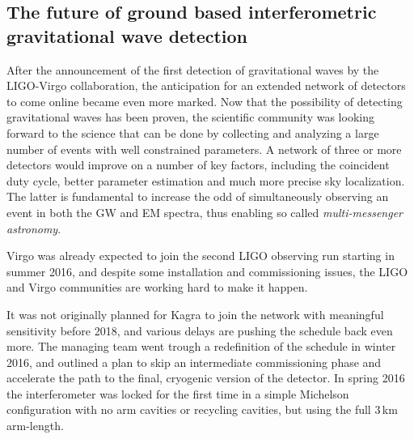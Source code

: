 \subsection{The future of ground based interferometric gravitational wave detection}\label{subsec:future}

After the announcement of the first detection of gravitational waves by the LIGO-Virgo collaboration, the anticipation for an extended network of detectors to come online became even more marked.
Now that the possibility of detecting gravitational waves has been proven, the scientific community was looking forward to the science that can be done by collecting and analyzing a large number of events with well constrained parameters.
A network of three or more detectors would improve on a number of key factors, including the coincident duty cycle, better parameter estimation and much more precise sky localization. The latter is fundamental to increase the odd of simultaneously observing an event in both the GW and EM spectra, thus enabling so called \textit{multi-messenger astronomy}.

Virgo was already expected to join the second LIGO observing run starting in summer 2016, and despite some installation and commissioning issues, the LIGO and Virgo communities are working hard to make it happen.

It was not originally planned for Kagra to join the network with meaningful sensitivity before 2018, and various delays are pushing the schedule back even more. 
The managing team went trough a redefinition of the schedule in winter 2016, and outlined a plan to skip an intermediate commissioning phase and accelerate the path to the final, cryogenic version of the detector. 
In spring 2016 the interferometer was locked for the first time in a simple Michelson configuration with no arm cavities or recycling cavities, but using the full 3\,km arm-length.


